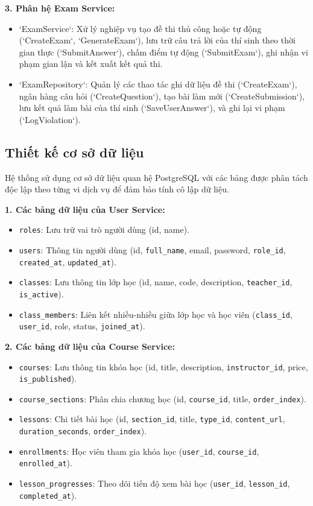 \documentclass[../DoAn.tex]{subfiles}
\begin{document}
\textbf{3. Phân hệ Exam Service:}
\begin{itemize}
    \item `ExamService`: Xử lý nghiệp vụ tạo đề thi thủ công hoặc tự động (`CreateExam`, `GenerateExam`), lưu trữ câu trả lời của thí sinh theo thời gian thực (`SubmitAnswer`), chấm điểm tự động (`SubmitExam`), ghi nhận vi phạm gian lận và kết xuất kết quả thi.
    \item `ExamRepository`: Quản lý các thao tác ghi dữ liệu đề thi (`CreateExam`), ngân hàng câu hỏi (`CreateQuestion`), tạo bài làm mới (`CreateSubmission`), lưu kết quả làm bài của thí sinh (`SaveUserAnswer`), và ghi lại vi phạm (`LogViolation`).
\end{itemize}

\subsection{Thiết kế cơ sở dữ liệu}
Hệ thống sử dụng cơ sở dữ liệu quan hệ PostgreSQL với các bảng được phân tách độc lập theo từng vi dịch vụ để đảm bảo tính cô lập dữ liệu.

\textbf{1. Các bảng dữ liệu của User Service:}
\begin{itemize}
    \item \texttt{roles}: Lưu trữ vai trò người dùng (id, name).
    \item \texttt{users}: Thông tin người dùng (id, \texttt{full\_name}, email, password, \texttt{role\_id}, \texttt{created\_at}, \texttt{updated\_at}).
    \item \texttt{classes}: Lưu thông tin lớp học (id, name, code, description, \texttt{teacher\_id}, \texttt{is\_active}).
    \item \texttt{class\_members}: Liên kết nhiều-nhiều giữa lớp học và học viên (\texttt{class\_id}, \texttt{user\_id}, role, status, \texttt{joined\_at}).
\end{itemize}

\textbf{2. Các bảng dữ liệu của Course Service:}
\begin{itemize}
    \item \texttt{courses}: Lưu thông tin khóa học (id, title, description, \texttt{instructor\_id}, price, \texttt{is\_published}).
    \item \texttt{course\_sections}: Phân chia chương học (id, \texttt{course\_id}, title, \texttt{order\_index}).
    \item \texttt{lessons}: Chi tiết bài học (id, \texttt{section\_id}, title, \texttt{type\_id}, \texttt{content\_url}, \texttt{duration\_seconds}, \texttt{order\_index}).
    \item \texttt{enrollments}: Học viên tham gia khóa học (\texttt{user\_id}, \texttt{course\_id}, \texttt{enrolled\_at}).
    \item \texttt{lesson\_progresses}: Theo dõi tiến độ xem bài học (\texttt{user\_id}, \texttt{lesson\_id}, \texttt{completed\_at}).
\end{itemize}
\end{document}

